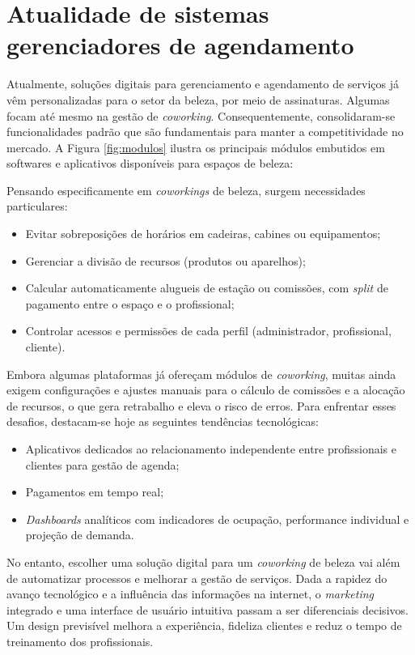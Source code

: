 \section{Atualidade de sistemas gerenciadores de agendamento}

Atualmente, soluções digitais para gerenciamento e agendamento de serviços já vêm personalizadas para o setor da beleza, por meio de assinaturas. Algumas focam até mesmo na gestão de \emph{coworking}. Consequentemente, consolidaram-se funcionalidades padrão que são fundamentais para manter a competitividade no mercado. A Figura \ref{fig:modulos} ilustra os principais módulos embutidos em softwares e aplicativos disponíveis para espaços de beleza:

Pensando especificamente em \emph{coworkings} de beleza, surgem necessidades particulares:
\begin{itemize}
	\item Evitar sobreposições de horários em cadeiras, cabines ou equipamentos;
	\item Gerenciar a divisão de recursos (produtos ou aparelhos);
	\item Calcular automaticamente alugueis de estação ou comissões, com \emph{split} de pagamento entre o espaço e o profissional;
	\item Controlar acessos e permissões de cada perfil (administrador, profissional, cliente).
\end{itemize}

Embora algumas plataformas já ofereçam módulos de \emph{coworking}, muitas ainda exigem configurações e ajustes manuais para o cálculo de comissões e a alocação de recursos, o que gera retrabalho e eleva o risco de erros. Para enfrentar esses desafios, destacam-se hoje as seguintes tendências tecnológicas:
\begin{itemize}
	\item Aplicativos dedicados ao relacionamento independente entre profissionais e clientes para gestão de agenda;
	\item Pagamentos em tempo real;
	\item \emph{Dashboards} analíticos com indicadores de ocupação, performance individual e projeção de demanda.
\end{itemize}

No entanto, escolher uma solução digital para um \emph{coworking} de beleza vai além de automatizar processos e melhorar a gestão de serviços. Dada a rapidez do avanço tecnológico e a influência das informações na internet, o \emph{marketing} integrado e uma interface de usuário intuitiva passam a ser diferenciais decisivos. Um design previsível melhora a experiência, fideliza clientes e reduz o tempo de treinamento dos profissionais.
